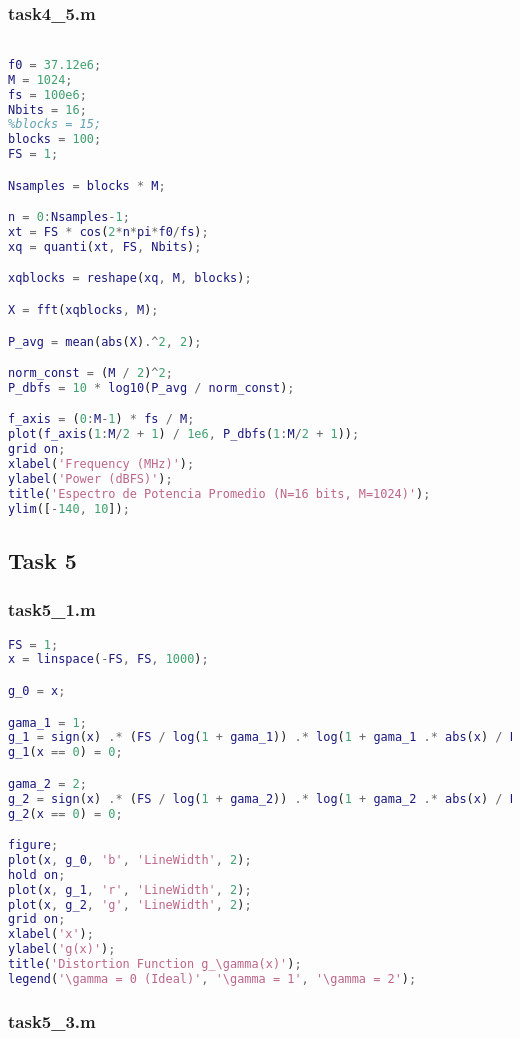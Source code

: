 \subsubsection{task4\_5.m}
\begin{lstlisting}[language=Matlab]

f0 = 37.12e6;
M = 1024;
fs = 100e6;
Nbits = 16;
%blocks = 15;
blocks = 100;
FS = 1;

Nsamples = blocks * M;

n = 0:Nsamples-1;
xt = FS * cos(2*n*pi*f0/fs);
xq = quanti(xt, FS, Nbits);

xqblocks = reshape(xq, M, blocks);

X = fft(xqblocks, M);

P_avg = mean(abs(X).^2, 2);

norm_const = (M / 2)^2;
P_dbfs = 10 * log10(P_avg / norm_const);

f_axis = (0:M-1) * fs / M;
plot(f_axis(1:M/2 + 1) / 1e6, P_dbfs(1:M/2 + 1));
grid on;
xlabel('Frequency (MHz)');
ylabel('Power (dBFS)');
title('Espectro de Potencia Promedio (N=16 bits, M=1024)');
ylim([-140, 10]);
\end{lstlisting}

\subsection{Task 5}
\subsubsection{task5\_1.m}
\begin{lstlisting}[language=Matlab]
FS = 1;
x = linspace(-FS, FS, 1000);

g_0 = x;

gama_1 = 1;
g_1 = sign(x) .* (FS / log(1 + gama_1)) .* log(1 + gama_1 .* abs(x) / FS);
g_1(x == 0) = 0;

gama_2 = 2;
g_2 = sign(x) .* (FS / log(1 + gama_2)) .* log(1 + gama_2 .* abs(x) / FS);
g_2(x == 0) = 0;

figure;
plot(x, g_0, 'b', 'LineWidth', 2);
hold on;
plot(x, g_1, 'r', 'LineWidth', 2);
plot(x, g_2, 'g', 'LineWidth', 2);
grid on;
xlabel('x');
ylabel('g(x)');
title('Distortion Function g_\gamma(x)');
legend('\gamma = 0 (Ideal)', '\gamma = 1', '\gamma = 2');
\end{lstlisting}

\subsubsection{task5\_3.m}
\begin{lstlisting}[language=Matlab]

\end{lstlisting}


